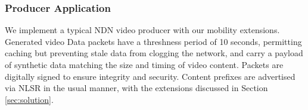 \documentclass[10pt,conference]{IEEEtran}
\begin{document}
% 

\subsubsection{Producer Application}
We implement a typical NDN video producer with our mobility extensions.
Generated video Data packets have a threshness period of 10 seconds, permitting caching but preventing stale data from clogging the network, and carry a payload of synthetic data matching the size and timing of video content. Packets are digitally signed to ensure integrity and security.
Content prefixes are advertised via NLSR in the usual manner, with the extensions discussed in Section \ref{sec:solution}.
\end{document}
